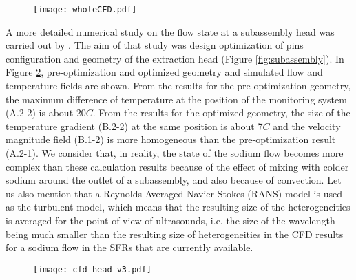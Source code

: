     \begin{figure}[htbp]
        \centerline{\texttt{[image: wholeCFD.pdf]}}
        \label{fig:wholeCFD}
    \end{figure}
%
    A more detailed numerical study on the flow state at a subassembly head was carried out by \textcite{Beck2017Conceptualdesignof}. The aim of that study was
design optimization of pins configuration and geometry of the extraction head (Figure \ref{fig:subassembly}). In Figure \ref{fig:cfd_head}, pre-optimization and
optimized geometry and simulated flow and temperature fields are shown. From the results for the pre-optimization geometry, the maximum difference of temperature at the
position of the monitoring system (A.2-2) is about \num{20}\textdegree{}$C$.
From the results for the optimized geometry, the size of the temperature gradient (B.2-2) at the same position is about \num{7}\textdegree{}$C$
and the velocity magnitude field (B.1-2) is more homogeneous than the pre-optimization result (A.2-1).
    We consider that, in reality, the state of the sodium flow becomes more complex than these calculation results
because of the effect of mixing with colder sodium around the outlet of a subassembly, and also because of convection.
Let us also mention that a Reynolds Averaged Navier-Stokes (RANS) model is used as the turbulent model, which means that the resulting size of the
heterogeneities is averaged for the point of view of ultrasounds, i.e. the size of the wavelength being much smaller than the resulting size of heterogeneities in the CFD results
for a sodium flow in the SFRs that are currently available.

    \begin{figure}[htbp]
        \centerline{\texttt{[image: cfd\_head\_v3.pdf]}}
        \label{fig:cfd_head}
    \end{figure}


